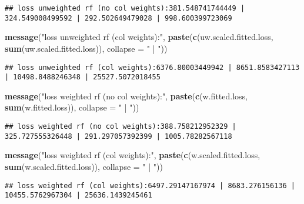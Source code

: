 \documentclass[10pt]{report}
\newenvironment{Shaded}{}{}
\newcommand{\KeywordTok}[1]{\textcolor[rgb]{0.00,0.44,0.13}{\textbf{{#1}}}}
\newcommand{\DataTypeTok}[1]{\textcolor[rgb]{0.56,0.13,0.00}{{#1}}}
\newcommand{\StringTok}[1]{\textcolor[rgb]{0.25,0.44,0.63}{{#1}}}
\newcommand{\NormalTok}[1]{{#1}}
\begin{document}
\begin{verbatim}
## loss unweighted rf (no col weights):381.548741744449 | 324.549008499592 | 292.502649479028 | 998.600399723069
\end{verbatim}

\begin{Shaded}
\begin{Highlighting}[]
\KeywordTok{message}\NormalTok{(}\StringTok{"loss unweighted rf (col weights):"}\NormalTok{, }\KeywordTok{paste}\NormalTok{(}\KeywordTok{c}\NormalTok{(uw.scaled.fitted.loss, }
    \KeywordTok{sum}\NormalTok{(uw.scaled.fitted.loss)), }\DataTypeTok{collapse =} \StringTok{" | "}\NormalTok{))}
\end{Highlighting}
\end{Shaded}

\begin{verbatim}
## loss unweighted rf (col weights):6376.80003449942 | 8651.8583427113 | 10498.8488246348 | 25527.5072018455
\end{verbatim}

\begin{Shaded}
\begin{Highlighting}[]
\KeywordTok{message}\NormalTok{(}\StringTok{"loss weighted rf (no col weights):"}\NormalTok{, }\KeywordTok{paste}\NormalTok{(}\KeywordTok{c}\NormalTok{(w.fitted.loss, }\KeywordTok{sum}\NormalTok{(w.fitted.loss)), }
    \DataTypeTok{collapse =} \StringTok{" | "}\NormalTok{))}
\end{Highlighting}
\end{Shaded}

\begin{verbatim}
## loss weighted rf (no col weights):388.758212952329 | 325.727555326448 | 291.297057392399 | 1005.78282567118
\end{verbatim}

\begin{Shaded}
\begin{Highlighting}[]
\KeywordTok{message}\NormalTok{(}\StringTok{"loss weighted rf (col weights):"}\NormalTok{, }\KeywordTok{paste}\NormalTok{(}\KeywordTok{c}\NormalTok{(w.scaled.fitted.loss, }\KeywordTok{sum}\NormalTok{(w.scaled.fitted.loss)), }
    \DataTypeTok{collapse =} \StringTok{" | "}\NormalTok{))}
\end{Highlighting}
\end{Shaded}

\begin{verbatim}
## loss weighted rf (col weights):6497.29147167974 | 8683.276156136 | 10455.5762967304 | 25636.1439245461
\end{verbatim}
\end{document}
